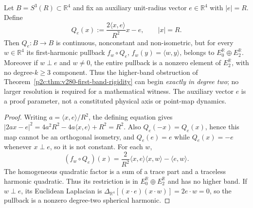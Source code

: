 \documentclass[12pt,a4paper]{article}
\begin{document}
\begin{proposition}
\label{p2c:prop:v280-sharp-quadratic-band-leakage}
Let $B=S^3(R)\subset\mathbb R^4$ and fix an auxiliary unit-radius
vector $e\in\mathbb R^4$ with $|e|=R$.  Define
\[
 \boxed{Q_e(x):=\frac{2\langle x,e\rangle}{R^2}x-e,
 \qquad |x|=R.}
 \tag{Q2-WIT}
\]
Then $Q_e:B\to B$ is continuous, nonconstant and non-isometric, but
for every $w\in\mathbb R^4$ its first-harmonic pullback
$f_w\circ Q_e$, $f_w(y)=\langle w,y\rangle$, belongs to
$E_0^{\mathbb R}\oplus E_2^{\mathbb R}$.  Moreover if $w\perp e$
and $w\ne0$, the entire pullback is a nonzero element of
$E_2^{\mathbb R}$, with no degree-$k\ge3$ component.  Thus the
higher-band obstruction of
Theorem~\ref{p2c:thm:v280-first-band-rigidity} can begin
\emph{exactly in degree two}; no larger resolution is required for a
mathematical witness.  The auxiliary vector $e$ is a proof parameter,
not a constituted physical axis or point-map dynamics.
\end{proposition}
\begin{proof}
Writing $a=\langle x,e\rangle/R^2$, the defining equation gives
$|2ax-e|^2=4a^2R^2-4a\langle x,e\rangle+R^2=R^2$.
Also $Q_e(-x)=Q_e(x)$, hence this map cannot be an orthogonal
isometry, and $Q_e(e)=e$ while $Q_e(x)=-e$ whenever
$x\perp e$, so it is not constant.  For each $w$,
\[
 (f_w\circ Q_e)(x)
 =\frac{2}{R^2}\langle x,e\rangle\langle x,w\rangle
  -\langle e,w\rangle.
\]
The homogeneous quadratic factor is a sum of a trace part and a
traceless harmonic quadratic.  Thus its restriction is in
$E_0^{\mathbb R}\oplus E_2^{\mathbb R}$ and has no higher band.
If $w\perp e$, its Euclidean Laplacian is
$\Delta_{\mathbb R^4}[(x\cdot e)(x\cdot w)]=2e\cdot w=0$,
so the pullback is a nonzero degree-two spherical harmonic.
\end{proof}
\end{document}
